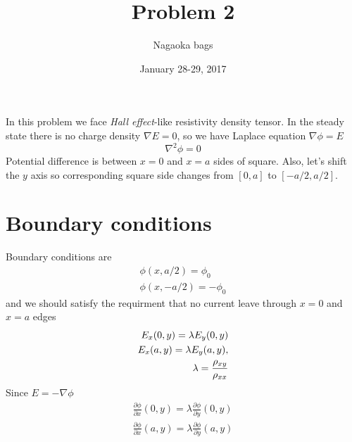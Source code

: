 \documentclass[a4paper]{article}
\title{Problem 2}
\author{Nagaoka bags}
\date{January 28-29, 2017}
\newcommand{\pd}{\partial}
\begin{document}
\maketitle
In this problem we face \textit{Hall effect}-like resistivity density tensor. 
In the steady state there is no charge density $\nabla E = 0$, so we have Laplace equation $\nabla \phi = E$
\begin{equation}
\nabla ^2 \phi = 0
\end{equation}
Potential difference is between $x = 0$ and $x = a$ sides of square. Also, let's shift the $y$ axis so corresponding square side changes from $[0,a]$ to $[-a/2,a/2]$.
\section{Boundary conditions}
Boundary conditions are 
\begin{equation}
\begin{split}
\phi(x,a/2) = \phi_0 \\
\phi(x,-a/2) = -\phi_0
\end{split}
\end{equation}
and we should satisfy the requirment that no current leave through $x = 0$ and $x = a$ edges
\begin{equation}
\begin{split}
E_x(0,y) = \lambda E_y(0,y) \\
E_x(a,y) = \lambda E_y(a,y), \\
\lambda = {\rho_{xy} \over \rho_{xx}}  
\end{split}
\end{equation} 
Since $E = - \nabla \phi$
\begin{equation}
\begin{split}
\frac{\pd \phi}{\pd x} (0,y) = \lambda \frac{\pd \phi}{\pd y} (0,y) \\
\frac{\pd \phi}{\pd x} (a,y) = \lambda \frac{\pd \phi}{\pd y} (a,y)
\end{split}
\end{equation} 
\end{document}

